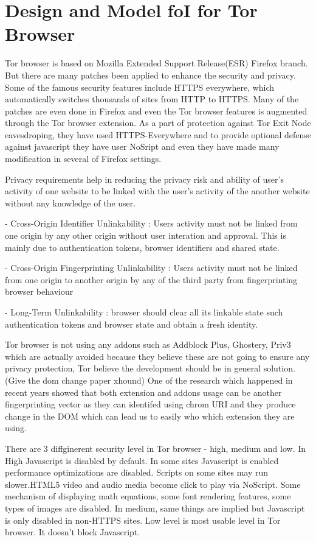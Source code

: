 \documentclass[conference]{IEEEtran}
\begin{document}
\section{Design and Model foI for Tor Browser}
Tor browser is based on Mozilla Extended Support Release(ESR) Firefox branch. But there are many patches been applied to enhance the security and privacy. Some of the famous security features include HTTPS everywhere, which automatically switches thousands of sites from HTTP to HTTPS. Many of the patches are even done in Firefox and even the Tor browser features is augmented through the Tor browser extension. As a part of protection against Tor Exit Node eavesdroping, they have used HTTPS-Everywhere and to provide optional defense against javascript they have user NoSript and even they have made many modification in several of Firefox settings.

Privacy requirements help in reducing the privacy risk and ability of user's activity of one website to be linked with the user's activity of the another website without any knowledge of the user. 

 - Cross-Origin Identifier Unlinkability :  
Users activity must not be linked from one origin by any other origin without user interation and approval. This is mainly due to authentication tokens, browser identifiers and shared state.

 - Cross-Origin Fingerprinting Unlinkability : Users activity must not be linked from one origin to another origin by any of the third party from fingerprinting browser behaviour

 - Long-Term Unlinkability : browser should clear all its linkable state such authentication tokens and browser state and obtain a fresh identity.
 
Tor browser is not using any addons such as Addblock Plus, Ghostery, Priv3 which are actually avoided because they believe these are not going to ensure any privacy protection, Tor believe the development should be in general solution. (Give the dom change paper xhound) One of the research which happened in recent years showed that both extension and addons usage can be another fingerprinting vector as they can identifed using chrom URI and they produce change in the DOM which can lead us to easily who which extension they are using.  

There are 3 diffginerent security level in Tor browser - high, medium and low. In High Javascript is disabled by default. In some sites Javascript is enabled performance optimizations are disabled. Scripts on some sites may run slower.HTML5 video and audio media become click to play via NoScript. Some mechanism of displaying math equations, some font rendering features, some  types of images are disabled. In medium, same things are implied but Javascript is only disabled in non-HTTPS sites. Low level is most usable level in Tor browser. It doesn't block Javascript. 
\end{document}
